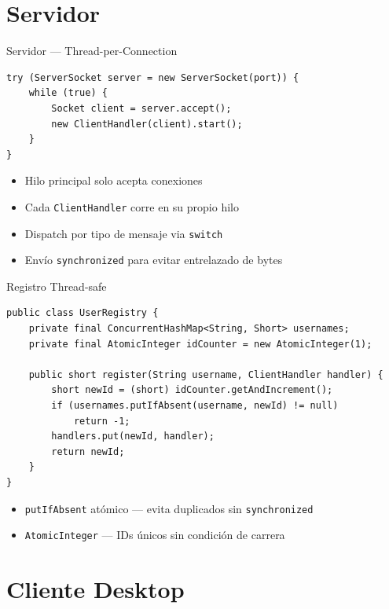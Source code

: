 \documentclass[aspectratio=169,14pt]{beamer}
\begin{document}
\section{Servidor}

\begin{frame}[fragile]{Servidor --- Thread-per-Connection}
\begin{lstlisting}[style=java]
try (ServerSocket server = new ServerSocket(port)) {
    while (true) {
        Socket client = server.accept();
        new ClientHandler(client).start();
    }
}
\end{lstlisting}

\vfill
\begin{itemize}
  \item Hilo principal solo acepta conexiones
  \item Cada \texttt{ClientHandler} corre en su propio hilo
  \item Dispatch por tipo de mensaje via \texttt{switch}
  \item Envío \texttt{synchronized} para evitar entrelazado de bytes
\end{itemize}
\end{frame}

\begin{frame}[fragile]{Registro Thread-safe}
\begin{lstlisting}[style=java]
public class UserRegistry {
    private final ConcurrentHashMap<String, Short> usernames;
    private final AtomicInteger idCounter = new AtomicInteger(1);

    public short register(String username, ClientHandler handler) {
        short newId = (short) idCounter.getAndIncrement();
        if (usernames.putIfAbsent(username, newId) != null)
            return -1;
        handlers.put(newId, handler);
        return newId;
    }
}
\end{lstlisting}

\begin{itemize}
  \item \texttt{putIfAbsent} atómico --- evita duplicados sin \texttt{synchronized}
  \item \texttt{AtomicInteger} --- IDs únicos sin condición de carrera
\end{itemize}
\end{frame}

\section{Cliente Desktop}
\end{document}
